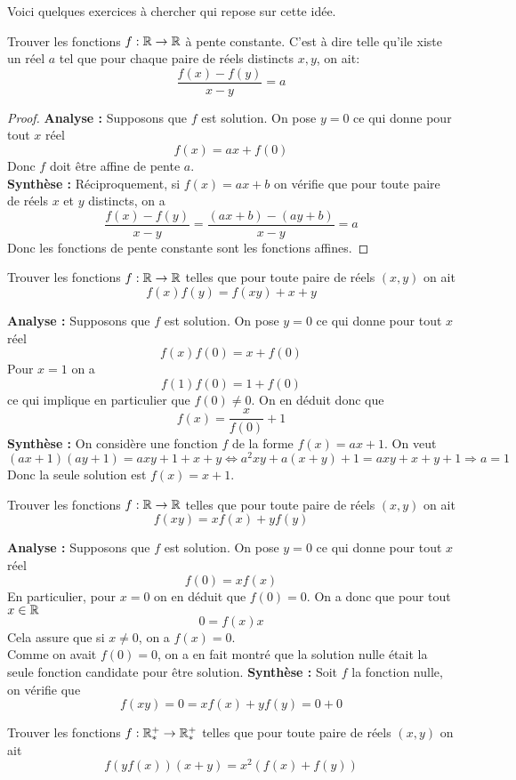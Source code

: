 Voici quelques exercices à chercher qui repose sur cette idée.
\begin{exo}[F]
Trouver les fonctions $f:\mathbb R\to \mathbb R$ à pente constante. C'est à dire telle qu'ile xiste un réel $a$ tel que pour chaque paire de réels distincts $x,y$, on ait:
$$\frac{f(x)-f(y)}{x-y}=a $$
\end{exo}

\begin{proof}
\textbf{Analyse :} Supposons que $f$ est solution. On pose $y=0$ ce qui donne pour tout $x$ réel
$$f(x)=ax+f(0) $$
Donc $f$ doit être affine de pente $a$.
\\
\textbf{Synthèse :} Réciproquement, si $f(x)=ax+b$ on vérifie que pour toute paire de réels $x$ et $y$ distincts, on a
$$\frac{f(x)-f(y)}{x-y}=\frac{(ax+b)-(ay+b)}{x-y}=a $$
Donc les fonctions de pente constante sont les fonctions affines.
\end{proof}
\begin{exo}[F]
Trouver les fonctions $f:\mathbb R\to \mathbb R$ telles que pour toute paire de réels $(x,y)$ on ait
$$f(x)f(y)=f(xy)+x+y $$
\end{exo}
\begin{preuve}
\textbf{Analyse :} Supposons que $f$ est solution. On pose $y=0$ ce qui donne pour tout $x$ réel
$$f(x)f(0)=x+f(0) $$
Pour $x=1$ on a
$$f(1)f(0)=1+f(0) $$ ce qui implique en particulier que $f(0)\neq 0$. On en déduit donc que 
$$f(x)=\frac{x}{f(0)}+1 $$
\textbf{Synthèse :} On considère une fonction $f$ de la forme $f(x)=ax+1$. On veut
$$(ax+1)(ay+1)=axy+1+x+y\iff a^2xy+a(x+y)+1=axy+x+y+1\Rightarrow a=1 $$
Donc la seule solution est $f(x)=x+1$.
\end{preuve}
\begin{exo}[F]
Trouver les fonctions $f:\mathbb R\to \mathbb R$ telles que pour toute paire de réels $(x,y)$ on ait
$$f(xy)=xf(x)+yf(y) $$

\end{exo}
\begin{preuve}
\textbf{Analyse :} Supposons que $f$ est solution. On pose $y=0$ ce qui donne pour tout $x$ réel
$$f(0)=xf(x) $$
En particulier, pour $x=0$ on en déduit que $f(0)=0$. On a donc que pour tout $x\in \mathbb R$
$$0=f(x)x $$ Cela assure que si $x\neq 0$, on a $f(x)=0$.
\\
Comme on avait $f(0)=0$, on a en fait montré que la solution nulle était la seule fonction candidate pour être solution.
\textbf{Synthèse :} Soit $f$ la fonction nulle, on  vérifie que 
$$f(xy)=0=xf(x)+yf(y)=0+0 $$
\end{preuve}
\begin{exo}[M]
Trouver les fonctions $f:\mathbb R_*^+\to \mathbb R_*^+$ telles que pour toute paire de réels $(x,y)$ on ait
$$f(yf(x))(x+y)=x^2(f(x)+f(y)) $$

\end{exo}
